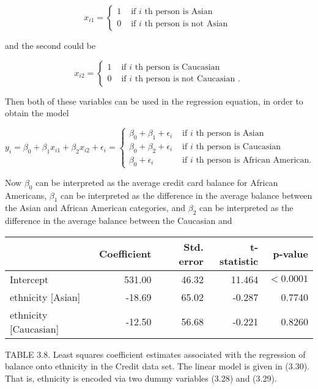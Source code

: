 \documentclass[10pt]{article}
\begin{document}
\[
x_{i 1}= \begin{cases}1 & \text { if } i \text { th person is Asian }  \tag{3.28}\\ 0 & \text { if } i \text { th person is not Asian }\end{cases}
\]

and the second could be

\[
x_{i 2}= \begin{cases}1 & \text { if } i \text { th person is Caucasian }  \tag{3.29}\\ 0 & \text { if } i \text { th person is not Caucasian } .\end{cases}
\]

Then both of these variables can be used in the regression equation, in order to obtain the model

\[
y_{i}=\beta_{0}+\beta_{1} x_{i 1}+\beta_{2} x_{i 2}+\epsilon_{i}= \begin{cases}\beta_{0}+\beta_{1}+\epsilon_{i} & \text { if } i \text { th person is Asian }  \tag{3.30}\\ \beta_{0}+\beta_{2}+\epsilon_{i} & \text { if } i \text { th person is Caucasian } \\ \beta_{0}+\epsilon_{i} & \text { if } i \text { th person is African American. }\end{cases}
\]

Now $\beta_{0}$ can be interpreted as the average credit card balance for African Americans, $\beta_{1}$ can be interpreted as the difference in the average balance between the Asian and African American categories, and $\beta_{2}$ can be interpreted as the difference in the average balance between the Caucasian and

\begin{center}
\begin{tabular}{l|rrrr}
\hline
 & Coefficient & Std. error & t-statistic & p-value \\
\hline
Intercept & 531.00 & 46.32 & 11.464 & $<0.0001$ \\
ethnicity [Asian] & -18.69 & 65.02 & -0.287 & 0.7740 \\
ethnicity [Caucasian] & -12.50 & 56.68 & -0.221 & 0.8260 \\
\hline
\end{tabular}
\end{center}

TABLE 3.8. Least squares coefficient estimates associated with the regression of balance onto ethnicity in the Credit data set. The linear model is given in (3.30). That is, ethnicity is encoded via two dummy variables (3.28) and (3.29).
\end{document}
